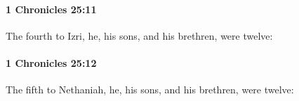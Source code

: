 		\paragraph{1 Chronicles 25:11} %
			\label{1CHRONICLES-25-11}

			The fourth to Izri, he, his sons, and his brethren, were twelve:


		\paragraph{1 Chronicles 25:12} %
			\label{1CHRONICLES-25-12}

			The fifth to Nethaniah, he, his sons, and his brethren, were twelve:



